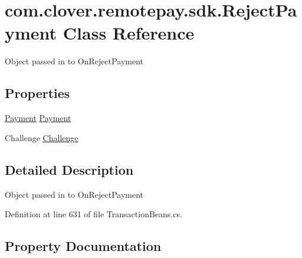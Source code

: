 \hypertarget{classcom_1_1clover_1_1remotepay_1_1sdk_1_1_reject_payment}{}\section{com.\+clover.\+remotepay.\+sdk.\+Reject\+Payment Class Reference}
\label{classcom_1_1clover_1_1remotepay_1_1sdk_1_1_reject_payment}


Object passed in to On\+Reject\+Payment  


\subsection*{Properties}
\begin{DoxyCompactItemize}
\item 
\hyperlink{classcom_1_1clover_1_1sdk_1_1v3_1_1payments_1_1_payment}{Payment} \hyperlink{classcom_1_1clover_1_1remotepay_1_1sdk_1_1_reject_payment_af2f407d26380d55c9c9a53258ab63f3e}{Payment}
\item 
Challenge \hyperlink{classcom_1_1clover_1_1remotepay_1_1sdk_1_1_reject_payment_aca8efd480294c897b18376fef8a8bb48}{Challenge}
\end{DoxyCompactItemize}


\subsection{Detailed Description}
Object passed in to On\+Reject\+Payment 



Definition at line 631 of file Transaction\+Beans.\+cs.



\subsection{Property Documentation}
\mbox{\label{classcom_1_1clover_1_1remotepay_1_1sdk_1_1_reject_payment_aca8efd480294c897b18376fef8a8bb48}} 
